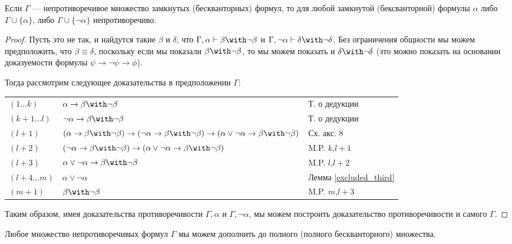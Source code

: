 \begin{lemma}
Если $\Gamma$ --- непротиворечивое множество замкнутых (бескванторных) формул, то для любой замкнутой (бексванторной) формулы
$\alpha$ либо $\Gamma \cup \{\alpha\}$, либо $\Gamma \cup \{\neg\alpha\}$
непротиворечиво.
\end{lemma}

\begin{proof}
Пусть это не так, и найдутся такие $\beta$ и $\delta$, что
$\Gamma, \alpha \vdash \beta \with \neg \beta$ и
$\Gamma, \neg\alpha \vdash \delta \with \neg \delta$.
Без ограничения общности мы можем предположить, что $\beta \equiv \delta$,
поскольку если мы показали $\beta \with \neg \beta$, то мы можем показать и
$\delta \with \neg \delta$ (это можно показать на основании доказуемости формулы 
$\psi \rightarrow \neg\psi \rightarrow \phi$).

Тогда рассмотрим следующее доказательства в предположении $\Gamma$:

\begin{tabular}{lll}\\
$(1\dots k)$ & $\alpha \rightarrow \beta \with \neg\beta$ & Т. о дедукции\\
$(k+1 \dots l)$ & $\neg\alpha \rightarrow \beta \with \neg\beta$ & Т. о дедукции\\
$(l+1)$ & $(\alpha \rightarrow \beta \with \neg\beta) \rightarrow (\neg\alpha\rightarrow \beta \with \neg\beta) \rightarrow (\alpha\vee\neg\alpha\rightarrow \beta \with \neg\beta)$ & Сх. акс. 8\\
$(l+2)$ & $(\neg\alpha\rightarrow \beta \with \neg\beta) \rightarrow (\alpha\vee\neg\alpha\rightarrow \beta \with \neg\beta)$ & M.P. $k$,$l+1$\\
$(l+3)$ & $\alpha\vee\neg\alpha\rightarrow \beta \with \neg\beta$ & M.P. $l$,$l+2$\\
$(l+4 \dots m)$ & $\alpha\vee\neg\alpha$ & Лемма \ref{excluded_third}\\
$(m+1)$ & $\beta \with \neg\beta$ & M.P. $m$,$l+3$
\end{tabular}

Таким образом, имея доказательства противоречивости $\Gamma,\alpha$ и
$\Gamma,\neg\alpha$, мы можем построить доказательство противоречивости и 
самого $\Gamma$.

\end{proof}

\begin{theorem}\label{make_full_set}
Любое множество непротиворечивых формул $\Gamma$ мы можем дополнить до полного
(полного бескванторного) множества.
\end{theorem}

